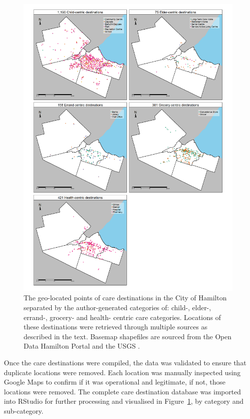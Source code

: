 \documentclass[
  super,
  preprint,
  3p]{elsarticle}
\begin{document}
\begin{figure}

{\centering \includegraphics[width=6.25in,height=\textheight]{figures/Fig2-plot_care_categories.png}

}

\caption{\label{fig-Fig2}The geo-located points of care destinations in
the City of Hamilton separated by the author-generated categories of:
child-, elder-, errand-, grocery- and health- centric care categories.
Locations of these destinations were retrieved through multiple sources
as described in the text. Basemap shapefiles are sourced from the Open
Data Hamilton Portal \citep{opendatahamiltonCityBoundary2023} and the
USGS \citep{greatlakesUSGS2010}.}

\end{figure}

Once the care destinations were compiled, the data was validated to
ensure that duplicate locations were removed. Each location was manually
inspected using Google Maps to confirm if it was operational and
legitimate, if not, those locations were removed. The complete care
destination database was imported into RStudio for further processing
and visualised in Figure~\ref{fig-Fig2}, by category and sub-category.
\end{document}
